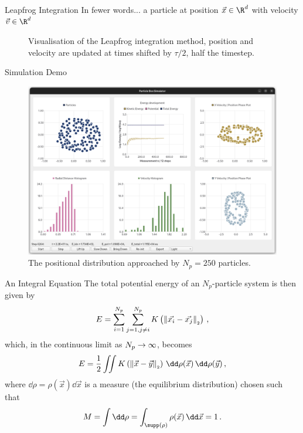\documentclass[aspectratio=169, hyperref={colorlinks=true}]{beamer}
\begin{document}
  \begin{frame}{Leapfrog Integration}
    In fewer words... a particle at position $\vec{x} \in \R^d$ with velocity $\vec{v} \in \R^d$
    \begin{figure}[H]
      \centering
      \caption[Leapfrog Visualisation]{Visualisation of the Leapfrog integration method, position and velocity are updated at times shifted by $\tau/2$, half the timestep.}
      \label{fig:leapfrog}
    \end{figure}
  \end{frame}

  \begin{frame}{Simulation Demo}
    \begin{figure}
      \centering
      \includegraphics[width=0.64\linewidth]{gui-screenshot.png}
      \caption*{The positional distribution approached by $N_p = 250$ particles.}
    \end{figure}
  \end{frame}

  \begin{frame}{An Integral Equation}
    \vspace{0.4cm}
    The total potential energy of an $N_p$-particle system is then given by
    $$E = \sum_{i=1}^{N_p} \sum_{j=1, j \neq i}^{N_p} K\left(\left\lVert\vec{x_i} - \vec{x_j}\right\rVert_{\scriptscriptstyle 2}\right)\,,$$
    which, in the continuous limit as $N_p \rightarrow \infty$, becomes
    $$E = \frac{1}{2} \iint K\left(\norm{\vec{x} - \vec{y}}\right) \,\dd\rho(\vec{x})\,\dd\rho(\vec{y})\,,$$
    where $\dd\rho = \rho(\vec{x})\dd\vec{x}$ is a measure (the equilibrium distribution) chosen such that
    $$M = \int \dd\rho = \int_{\supp(\rho)} \rho(\vec{x}) \,\dd\vec{x} = 1\,.$$
  \end{frame}
\end{document}
